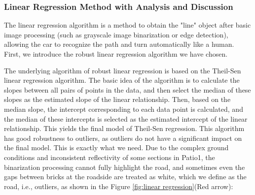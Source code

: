 \documentclass[12pt, a4paper, oneside]{report}
\begin{document}
	\subsubsection{Linear Regression Method with Analysis and Discussion}
The linear regression algorithm is a method to obtain the "line" object after basic image processing (such as grayscale image binarization or edge detection), allowing the car to recognize the path and turn automatically like a human. First, we introduce the robust linear regression algorithm we have chosen.

The underlying algorithm of robust linear regression is based on the Theil-Sen linear regression algorithm. The basic idea of the algorithm is to calculate the slopes between all pairs of points in the data, and then select the median of these slopes as the estimated slope of the linear relationship. Then, based on the median slope, the intercept corresponding to each data point is calculated, and the median of these intercepts is selected as the estimated intercept of the linear relationship. This yields the final model of Theil-Sen regression. This algorithm has good robustness to outliers, as outliers do not have a significant impact on the final model. This is exactly what we need. Due to the complex ground conditions and inconsistent reflectivity of some sections in Patio1, the binarization processing cannot fully highlight the road, and sometimes even the gaps between bricks at the roadside are treated as white, which we define as the road, i.e., outliers, as shown in the Figure \ref{fig:linear regression}(Red arrow):
\end{document}
